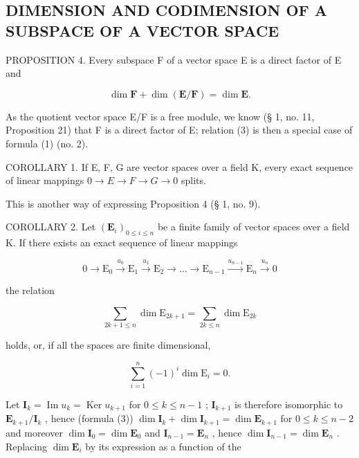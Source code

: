 \subsection{DIMENSION AND CODIMENSION OF A SUBSPACE OF A VECTOR SPACE}

PROPOSITION 4. Every subspace F of a vector space E is a direct factor of E and

\[
\dim \mathbf {F} + \dim (\mathbf {E} / \mathbf {F}) = \dim \mathbf {E}.\tag{3}
\]

As the quotient vector space E/F is a free module, we know (§ 1, no. 11, Proposition 21) that F is a direct factor of E; relation (3) is then a special case of formula (1) (no. 2).

COROLLARY 1. If E, F, G are vector spaces over a field K, every exact sequence of linear mappings \(0 \rightarrow E \rightarrow F \rightarrow G \rightarrow 0\) splits.

This is another way of expressing Proposition 4 (§ 1, no. 9).

COROLLARY 2. Let \((\mathbf{E}_i)_{0\leqslant i\leqslant n}\) be a finite family of vector spaces over a field K. If there exists an exact sequence of linear mappings

\[
0 \longrightarrow \mathrm{E} _ {0} \stackrel {u _ {0}} {\longrightarrow} \mathrm{E} _ {1} \stackrel {u _ {1}} {\longrightarrow} \mathrm{E} _ {2} \longrightarrow \dots \longrightarrow \mathrm{E} _ {n - 1} \stackrel {u _ {n - 1}} {\longrightarrow} \mathrm{E} _ {n} \stackrel {u _ {n}} {\longrightarrow} 0\tag{4}
\]

the relation

\[
\sum_ {2 k + 1 \leqslant n} \dim \mathrm{E} _ {2 k + 1} = \sum_ {2 k \leqslant n} \dim \mathrm{E} _ {2 k}\tag{5}
\]

holds, or, if all the spaces are finite dimensional,

\[
\sum_ {i = 1} ^ {n} (- 1) ^ {i} \dim \mathrm{E} _ {i} = 0.\tag{6}
\]

Let \(\mathbf{I}_k = \operatorname{Im} u_k = \operatorname{Ker} u_{k+1}\) for \(0 \leqslant k \leqslant n-1\) ; \(\mathbf{I}_{k+1}\) is therefore isomorphic to \(\mathbf{E}_{k+1}/\mathbf{I}_k\) , hence (formula (3)) \(\dim \mathbf{I}_k + \dim \mathbf{I}_{k+1} = \dim \mathbf{E}_{k+1}\) for \(0 \leqslant k \leqslant n-2\) and moreover \(\dim \mathbf{I}_0 = \dim \mathbf{E}_0\) and \(\mathbf{I}_{n-1} = \mathbf{E}_n\) , hence \(\dim \mathbf{I}_{n-1} = \dim \mathbf{E}_n\) . Replacing \(\dim \mathbf{E}_i\) by its expression as a function of the

